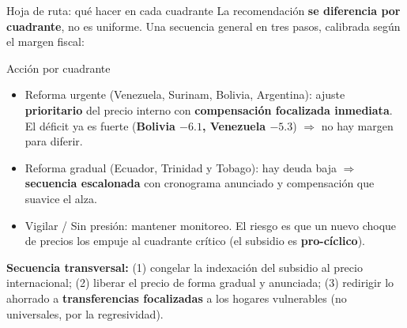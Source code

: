 \documentclass[aspectratio=169,10pt]{beamer}
\newcommand{\key}[1]{{\bfseries\color{AcentoRojo}#1}}
\begin{document}
\begin{frame}{Hoja de ruta: qué hacer en cada cuadrante}
  \small
  La recomendación \textbf{se diferencia por cuadrante}, no es uniforme. Una secuencia general en
  tres pasos, calibrada según el margen fiscal:
  \begin{block}{Acción por cuadrante}
    \footnotesize
    \begin{itemize}
      \item \alert{Reforma urgente} (Venezuela, Surinam, Bolivia, Argentina): ajuste
            \textbf{prioritario} del precio interno con \textbf{compensación focalizada inmediata}.
            El déficit ya es fuerte (\key{Bolivia $-6.1$, Venezuela $-5.3$}) $\Rightarrow$ no hay
            margen para diferir.
      \item \alert{Reforma gradual} (Ecuador, Trinidad y Tobago): hay deuda baja $\Rightarrow$
            \textbf{secuencia escalonada} con cronograma anunciado y compensación que suavice el alza.
      \item \alert{Vigilar / Sin presión:} mantener monitoreo. El riesgo es que un nuevo choque de
            precios los empuje al cuadrante crítico (el subsidio es \textbf{pro-cíclico}).
    \end{itemize}
  \end{block}
  \vspace{-0.2em}
  {\footnotesize \textbf{Secuencia transversal:} (1) congelar la indexación del subsidio al precio
  internacional; (2) liberar el precio de forma gradual y anunciada; (3) redirigir lo ahorrado a
  \textbf{transferencias focalizadas} a los hogares vulnerables (no universales, por la regresividad).}

\end{frame}
\end{document}
